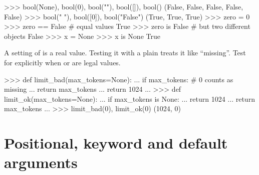 \begin{center}
\end{center}

\begin{pycode}
>>> bool(None), bool(0), bool(""), bool([]), bool({})
(False, False, False, False, False)
>>> bool(" "), bool([0]), bool("False")
(True, True, True)
>>> zero = 0
>>> zero == False       # equal values
True
>>> zero is False       # but two different objects
False
>>> x = None
>>> x is None
True
\end{pycode}

\begin{trap}
A setting of  is a real value. Testing it with a plain  treats it like
``missing''. Test for  explicitly when  or  are legal values.
\end{trap}

\begin{pycode}
>>> def limit_bad(max_tokens=None):
...     if max_tokens:               # 0 counts as missing
...         return max_tokens
...     return 1024
...
>>> def limit_ok(max_tokens=None):
...     if max_tokens is None:
...         return 1024
...     return max_tokens
...
>>> limit_bad(0), limit_ok(0)
(1024, 0)
\end{pycode}

\section{Positional, keyword and default arguments}

